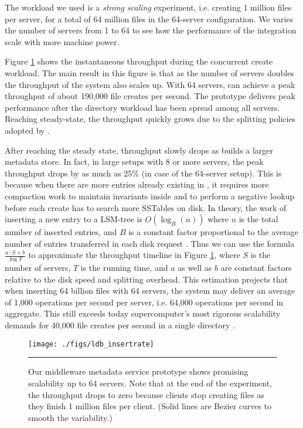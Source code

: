 The workload we used is a \textit{strong scaling} experiment, i.e.
creating 1 million files per server, for a total of 64 million files in the
64-server configuration. We varies the number of servers from 1 to 64
to see how the performance of the integration scale with more machine power.

Figure \ref{graph:ldb-scaling} shows the instantaneous throughput
during the concurrent create workload.
The main result in this figure is that as the number of servers doubles the
throughput of the system also scales up. With 64 servers, \giga can achieve a
peak throughput of about 190,000 file creates per second.
The prototype delivers peak performance after the directory workload
has been spread among all servers.
Reaching steady-state, the throughput quickly grows
due to the splitting policies adopted by \giga.

After reaching the steady state, throughput slowly drops
as \tfs builds a larger metadata store.
In fact, in large setups with 8 or more servers,
the peak throughput drops by as much as 25\% (in case of the 64-server setup).
This is because when there are more entries already existing in \tfs,
it requires more compaction work to maintain invariants inside \ldb
and to perform a negative lookup before each create
has to search more SSTables on disk.
In theory, the work of inserting a new entry to a LSM-tree is $O(\log_{B}(n))$
where $n$ is the total number of inserted entries, and $B$ is a constant factor
proportional to the average number of entries transferred in each disk request
\cite{Bender2007}.
Thus we can use the formula $\frac{a\cdot S+b}{\log{T}}$ to
approximate the throughput timeline in Figure \ref{graph:ldb-scaling},
where $S$ is the number of servers, $T$ is the running time,
and $a$ as well as $b$ are constant factors
relative to the disk speed and splitting overhead.
This estimation projects that when inserting 64 billion files with 64 servers,
the system may deliver an average of 1,000 operations per second per server,
i.e. 64,000 operations per second in aggregate.
This still exceeds today supercomputer's most rigorous scalability demands for
40,000 file creates per second in a single directory \cite{hpcs-io:2008}.

\begin{figure}[t]
\centerline{\texttt{[image: ./figs/ldb\_insertrate]}}
\vspace{10pt}
\caption{\textsf{\footnotesize 
Our middleware metadata service prototype shows promising scalability
up to 64 servers.
Note that at the end of the experiment,
the throughput drops to zero
because clients stop creating files as they finish 1 million files per client.
(Solid lines are Bezier curves to smooth the variability.)
}
}
\hrule
\label{graph:ldb-scaling}
\end{figure}



